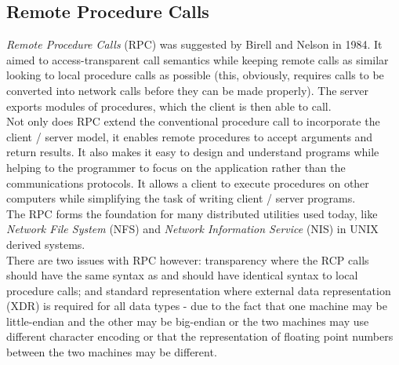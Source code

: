 \subsection{Remote Procedure Calls}
\textit{Remote Procedure Calls} (RPC) was suggested by Birell and Nelson in 1984. It aimed to access-transparent call semantics while keeping remote calls as similar looking to local procedure calls as possible (this, obviously, requires calls to be converted into network calls before they can be made properly). The server exports modules of procedures, which the client is then able to call. \\

Not only does RPC extend the conventional procedure call to incorporate the client / server model, it enables remote procedures to accept arguments and return results. It also makes it easy to design and understand programs while helping to the programmer to focus on the application rather than the communications protocols. It allows a client to execute procedures on other computers while simplifying the task of writing client / server programs.\\

The RPC forms the foundation for many distributed utilities used today, like \textit{Network File System} (NFS) and \textit{Network Information Service} (NIS) in UNIX derived systems.\\

There are two issues with RPC however: transparency where the RCP calls should have the same syntax as and should have identical syntax to local procedure calls; and standard representation where external data representation (XDR) is required for all data types - due to the fact that one machine may be little-endian and the other may be big-endian or the two machines may use different character encoding or that the representation of floating point numbers between the two machines may be different.



